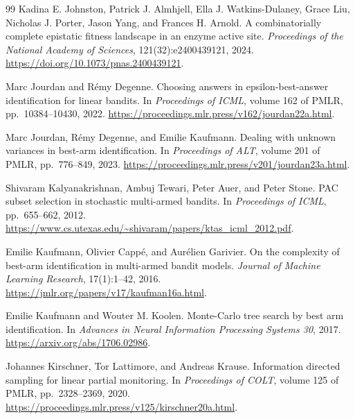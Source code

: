 \documentclass{article}
\theoremstyle{plain}
\theoremstyle{definition}
\begin{document}
\begin{thebibliography}{99}
Kadina E. Johnston, Patrick J. Almhjell, Ella J. Watkins-Dulaney, Grace Liu, Nicholas J. Porter, Jason Yang, and Frances H. Arnold.
A combinatorially complete epistatic fitness landscape in an enzyme active site.
\emph{Proceedings of the National Academy of Sciences}, 121(32):e2400439121, 2024.
\url{https://doi.org/10.1073/pnas.2400439121}.

Marc Jourdan and R\'emy Degenne.
Choosing answers in epsilon-best-answer identification for linear bandits.
In \emph{Proceedings of ICML}, volume 162 of PMLR, pp.\ 10384--10430, 2022.
\url{https://proceedings.mlr.press/v162/jourdan22a.html}.

Marc Jourdan, R\'emy Degenne, and Emilie Kaufmann.
Dealing with unknown variances in best-arm identification.
In \emph{Proceedings of ALT}, volume 201 of PMLR, pp.\ 776--849, 2023.
\url{https://proceedings.mlr.press/v201/jourdan23a.html}.

Shivaram Kalyanakrishnan, Ambuj Tewari, Peter Auer, and Peter Stone.
PAC subset selection in stochastic multi-armed bandits.
In \emph{Proceedings of ICML}, pp.\ 655--662, 2012.
\url{https://www.cs.utexas.edu/~shivaram/papers/ktas_icml_2012.pdf}.

Emilie Kaufmann, Olivier Capp\'e, and Aur\'elien Garivier.
On the complexity of best-arm identification in multi-armed bandit models.
\emph{Journal of Machine Learning Research}, 17(1):1--42, 2016.
\url{https://jmlr.org/papers/v17/kaufman16a.html}.

Emilie Kaufmann and Wouter M. Koolen.
Monte-Carlo tree search by best arm identification.
In \emph{Advances in Neural Information Processing Systems 30}, 2017.
\url{https://arxiv.org/abs/1706.02986}.

Johannes Kirschner, Tor Lattimore, and Andreas Krause.
Information directed sampling for linear partial monitoring.
In \emph{Proceedings of COLT}, volume 125 of PMLR, pp.\ 2328--2369, 2020.
\url{https://proceedings.mlr.press/v125/kirschner20a.html}.


\end{thebibliography}
\end{document}
